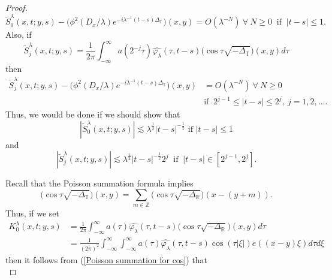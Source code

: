 \documentclass[11pt]{amsart}
\numberwithin{equation}{section}
\newcommand{\la}{\lambda}
\newcommand{\R}[1][]{\mathbb{R}^#1}
\newcommand{\Z}[1][]{\mathbb{Z}^#1}
\newcommand{\T}[1][]{\mathbb{T}^#1}
\newcommand{\laplac}[1]{\Delta_{#1}}
\begin{document}
\begin{proof}
\begin{equation}
    \tilde{S}^{\la}_{0}(x,t;y,s) - \big(\phi^2(D_x/\la)e^{-i\la^{-1}(t-s)\laplac{\T{}}}\big)(x,y) = O(\la^{-N}) \  \forall \  N \geq 0 \ \text{ if } \ |t-s| \leq 1.
\end{equation}
Also, if 
\begin{equation}
    \tilde{S}^{\la}_{j}(x,t;y,s) = \frac{1}{2\pi}\int_{-\infty}^{\infty}a(2^{-j}\tau) \widehat{\varphi_{\la}}(\tau, t-s)\big(\cos\tau\sqrt{-\laplac{\T{}}}\big)(x,y)d\tau
\end{equation}
then 
\begin{equation}
\begin{split}
    \tilde{S}^{\la}_{j}(x,t;y,s) - \big(\phi^2(D_x/\la)e^{-i\la^{-1}(t-s)\laplac{\T{}}}\big)(x,y) &= O(\la^{-N}) \  \forall \  N \geq 0 \\
    &\text{if } \ 2^{j-1} \leq |t-s| \leq 2^j, \ j = 1,2, ....
\end{split}
\end{equation}
Thus, we would be done if we should show that 
\begin{equation} \label{estimate for 0 term}
    |\tilde{S}^{\la}_{0}(x,t;y,s)| \lesssim \la^{\frac{1}{2}}|t-s|^{-\frac{1}{2}} \text{ if } |t-s| \leq 1
\end{equation}
and 
\begin{equation} \label{estimate for j term}
    |\tilde{S}^{\la}_{j}(x,t;y,s)| \lesssim \la^{\frac{1}{2}}|t-s|^{-\frac{1}{2}}2^{j} \ \text{ if } \ |t-s| \in [2^{j-1}, 2^j].
\end{equation}
\par
Recall that the Poisson summation formula implies
\begin{equation} \label{Poisson summation for cos}
    \big(\cos\tau\sqrt{-\laplac{\T{}}}\big)(x,y)= \sum_{m \in \Z{}}\big(\cos\tau\sqrt{-\laplac{\R{}}}\big)(x-(y + m)).
\end{equation}
Thus, if we set 
\begin{equation}
\begin{split}
    K^{\la}_{0}(x,t;y,s) &= \frac{1}{2\pi}\int_{-\infty}^{\infty}a(\tau) \widehat{\varphi_{\la}}(\tau, t-s)\big(\cos\tau\sqrt{-\laplac{\R{}}}\big)(x,y)d\tau \\
    &= \frac{1}{(2\pi)^{2}}\int_{-\infty}^{\infty}\int_{-\infty}^{\infty} a(\tau) \widehat{\varphi_{\la}}(\tau, t-s)\cos(\tau|\xi|)e((x-y)\xi)d\tau d\xi
    \end{split}
\end{equation}
then it follows from (\ref{Poisson summation for cos}) that
\begin{equation} \label{Poisson summation formula for 0 term}

\end{equation}
\end{proof}
\end{document}
